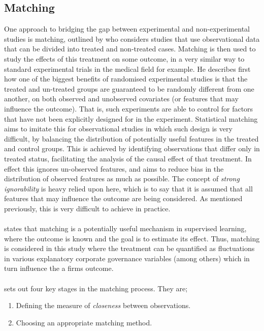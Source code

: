 {\subsection{Matching}\label{matching}
{One approach to bridging the gap between experimental and non-experimental studies is matching, outlined by \cite{stuart2010matching} who considers studies that use observational data that can be divided into treated and non-treated cases. Matching is then used to study the effects of this treatment on some outcome, in a very similar way to standard experimental trials in the medical field for example. He describes first how one of the biggest benefits of randomised experimental studies is that the treated and un-treated groups are guaranteed to be randomly different from one another, on both observed and unobserved covariates (or features that may influence the outcome). That is, such experiments are able to control for factors that have not been explicitly designed for in the experiment. Statistical matching aims to imitate this for observational studies in which such design is very difficult, by balancing the distribution of potentially useful features in the treated and control groups. This is achieved by identifying observations that differ only in treated status, facilitating the analysis of the causal effect of that treatment. In effect this ignores un-observed features, and aims to reduce bias in the distribution of observed features as much as possible. The concept of {\it strong ignorability} is heavy relied upon here, which is to say that it is assumed that all features that may influence the outcome are being considered. As mentioned previously, this is very difficult to achieve in practice. \\\\
\cite {stuart2010matching} states that matching is a potentially useful mechanism in supervised learning, where the outcome is known and the goal is to estimate its effect. Thus, matching is considered in this study where the treatment can be quantified as fluctuations in various explanatory corporate governance variables (among others) which in turn influence the a firms outcome. \\\\
\cite {stuart2010matching} sets out four key stages in the matching process. They are;
\begin {enumerate}
\item{Defining the measure of {\it closeness} between observations.}
\item{Choosing an appropriate matching method.}

\end{enumerate}}}
